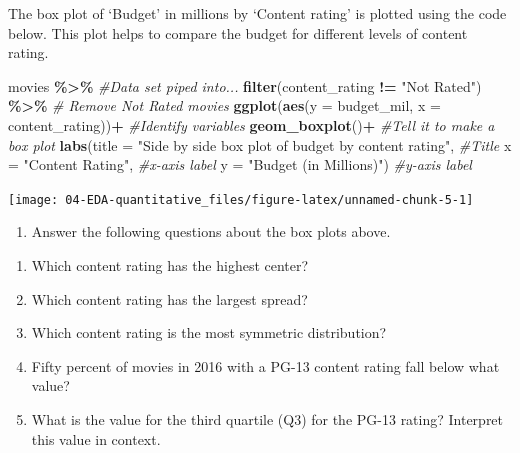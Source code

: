 \documentclass[
]{report}
\newenvironment{Shaded}{\begin{snugshade}}{\end{snugshade}}
\newcommand{\CommentTok}[1]{\textcolor[rgb]{0.56,0.35,0.01}{\textit{#1}}}
\newcommand{\DataTypeTok}[1]{\textcolor[rgb]{0.13,0.29,0.53}{#1}}
\newcommand{\KeywordTok}[1]{\textcolor[rgb]{0.13,0.29,0.53}{\textbf{#1}}}
\newcommand{\NormalTok}[1]{#1}
\newcommand{\OperatorTok}[1]{\textcolor[rgb]{0.81,0.36,0.00}{\textbf{#1}}}
\newcommand{\StringTok}[1]{\textcolor[rgb]{0.31,0.60,0.02}{#1}}
\providecommand{\tightlist}{%
  \setlength{\itemsep}{0pt}\setlength{\parskip}{0pt}}
\begin{document}
The box plot of `Budget' in millions by `Content rating' is plotted using the code below. This plot helps to compare the budget for different levels of content rating.

\begin{Shaded}
\begin{Highlighting}[]
\NormalTok{movies }\OperatorTok{\%\textgreater{}\%}\StringTok{  }\CommentTok{\#Data set piped into...}
\StringTok{  }\KeywordTok{filter}\NormalTok{(content\_rating }\OperatorTok{!=}\StringTok{ "Not Rated"}\NormalTok{) }\OperatorTok{\%\textgreater{}\%}\StringTok{ }\CommentTok{\# Remove Not Rated movies}
\StringTok{  }\KeywordTok{ggplot}\NormalTok{(}\KeywordTok{aes}\NormalTok{(}\DataTypeTok{y =}\NormalTok{ budget\_mil, }\DataTypeTok{x =}\NormalTok{ content\_rating))}\OperatorTok{+}\StringTok{  }\CommentTok{\#Identify variables}
\StringTok{  }\KeywordTok{geom\_boxplot}\NormalTok{()}\OperatorTok{+}\StringTok{  }\CommentTok{\#Tell it to make a box plot}
\StringTok{  }\KeywordTok{labs}\NormalTok{(}\DataTypeTok{title =} \StringTok{"Side by side box plot of budget by content rating"}\NormalTok{,  }\CommentTok{\#Title}
        \DataTypeTok{x =} \StringTok{"Content Rating"}\NormalTok{,    }\CommentTok{\#x{-}axis label}
       \DataTypeTok{y =} \StringTok{"Budget (in Millions)"}\NormalTok{)  }\CommentTok{\#y{-}axis label}
\end{Highlighting}
\end{Shaded}

\begin{center}\texttt{[image: 04-EDA-quantitative\_files/figure-latex/unnamed-chunk-5-1]} \end{center}

\begin{enumerate}
\def\labelenumi{\arabic{enumi}.}
\setcounter{enumi}{11}
\tightlist
\item
  Answer the following questions about the box plots above.
\end{enumerate}

\begin{enumerate}
\def\labelenumi{\alph{enumi}.}
\item
  Which content rating has the highest center?
  \vspace{0.2in}
\item
  Which content rating has the largest spread?
  \vspace{0.2in}
\item
  Which content rating is the most symmetric distribution?
  \vspace{0.2in}
\item
  Fifty percent of movies in 2016 with a PG-13 content rating fall below what value?
  \vspace{0.2in}
\item
  What is the value for the third quartile (Q3) for the PG-13 rating? Interpret this value in context.
  \vspace{.5in}
\end{enumerate}
\end{document}
